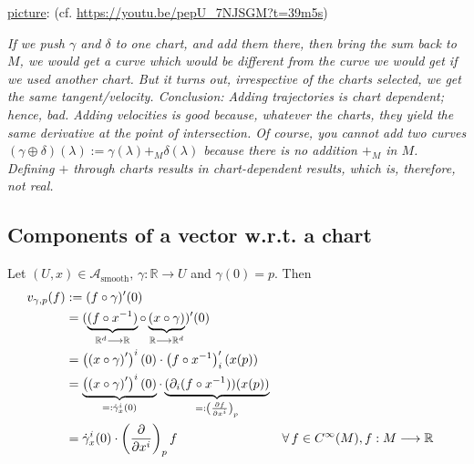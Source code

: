 \underline{picture}: (cf. \url{https://youtu.be/pepU_7NJSGM?t=39m5s})

\textit{If we push $\gamma$ and $\delta$ to one chart, and add them there, then bring the sum back to $M$, we would get a curve which would be different from the curve we would get if we used another chart. But it turns out, irrespective of the charts selected, we get the same tangent/velocity. Conclusion: Adding trajectories is chart dependent; hence, bad. Adding velocities is good because, whatever the charts, they yield the same derivative at the point of intersection. Of course, you cannot add two curves $(\gamma \oplus \delta)(\lambda) := \gamma(\lambda) +_M \delta(\lambda)$ because there is no addition $+_M$ in $M$. Defining $+$ through charts results in chart-dependent results, which is, therefore, not real.}  

\subsection{Components of a vector w.r.t. a chart}

Let $(U,x) \in \mathcal{A}_{\text{smooth}}, \, \gamma : \mathbb{R} \to U$ and $\gamma(0) = p$. Then
\begin{align*}
  v_{\gamma,p}(f) & := (f \after \gamma)^\prime(0) \\
  & = (\underbrace{(f \after x^{-1})}_{\mathbb{R}^d \to \mathbb{R}} \after \underbrace{(x \after \gamma)}_{\mathbb{R} \to \mathbb{R}^d})^\prime(0) \\
  & = \displaystyle\left(\left(x \after \gamma\right)^\prime\right)^i(0) \cdot \left(f \after x^{-1}\right)^\prime_i(x(p)) \\
  & = \underbrace{\displaystyle\left(\left(x \after \gamma\right)^\prime\right)^i(0)}_{=: \dot{\gamma}_x^i(0)} \cdot \underbrace{(\partial_i(f \after x^{-1}))(x(p))}_{=: \left(\cibasis[f]{x^i}\right)_p} \\
  & = \dot{\gamma}_x^i(0) \cdot \left(\cibasis{x^i}\right)_p f && \forall \, f \in C^{\infty}(M), f : M \to \mathbb{R}
\end{align*}

